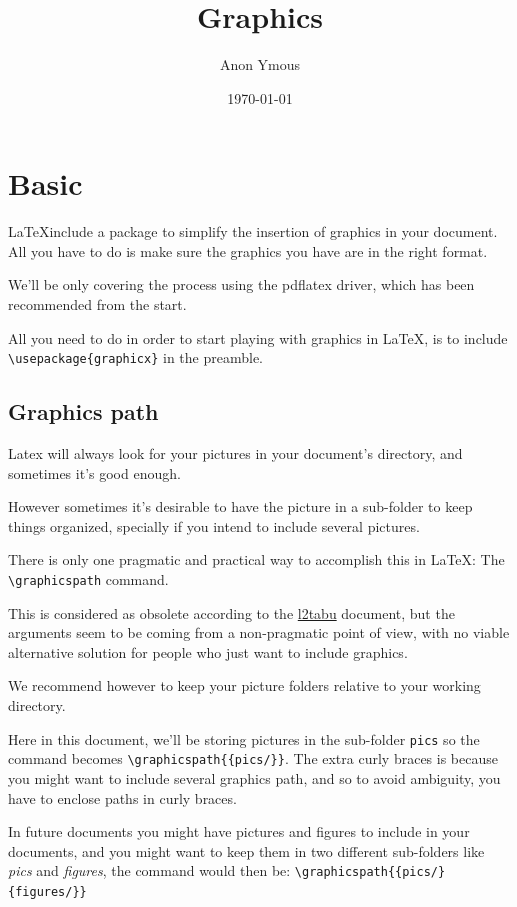\documentclass[a4paper]{article}
\author{Anon Ymous}
\date{\today}
\title{Graphics}
\begin{document}
\maketitle
\tableofcontents

\section{Basic}
\LaTeX include a package to simplify the insertion of graphics in your document.
All you have to do is make sure the graphics you have are in the right format.

We'll be only covering the process using the pdflatex driver, which has been
recommended from the start.

All you need to do in order to start playing with graphics in \LaTeX, is to
include \verb`\usepackage{graphicx}` in the preamble.

\subsection{Graphics path}
Latex will always look for your pictures in your document's directory, and
sometimes it's good enough.

However sometimes it's desirable to have the picture in a sub-folder to keep
things organized, specially if you intend to include several pictures.

There is only one pragmatic and practical way to accomplish this in \LaTeX:
The \verb`\graphicspath` command.

This is considered as obsolete according to the
\href{http://www.ctan.org/tex-archive/info/l2tabu}{l2tabu} document, but
the arguments seem to be coming from a non-pragmatic point of view, with no
viable alternative solution for people who just want to include graphics.

We recommend however to keep your picture folders relative to your working
directory.

Here in this document, we'll be storing pictures in the sub-folder \texttt{pics}
so the command becomes \verb`\graphicspath{{pics/}}`. The extra curly braces
is because you might want to include several graphics path, and so to avoid
ambiguity, you have to enclose paths in curly braces.

In future documents you might have pictures and figures to include in your
documents, and you might want to keep them in two different sub-folders like
\textit{pics} and \textit{figures}, the command would then be:
\verb`\graphicspath{{pics/}{figures/}}`
\end{document}
